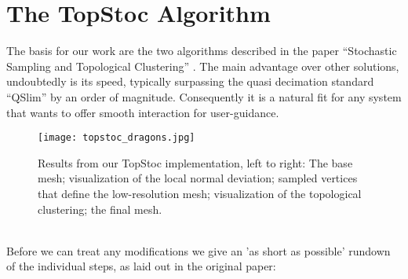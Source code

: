 \section{The TopStoc Algorithm}
\label{topstoc1}

The basis for our work are the two algorithms described in the paper ``Stochastic Sampling and Topological Clustering'' \citep[cf.][]{Boubekeur2009}.
The main advantage over other solutions, undoubtedly is its speed, typically surpassing the quasi decimation standard ``QSlim'' by an order of magnitude.
Consequently it is a natural fit for any system that wants to offer smooth interaction for user-guidance. 
\begin{figure}[ht]
\centering
\texttt{[image: topstoc\_dragons.jpg]}
\caption{Results from our TopStoc implementation, left to right: The base mesh; visualization of the local normal deviation; sampled vertices that define the low-resolution mesh; visualization of the topological clustering; the final mesh.}
\label{fig:topstoc_dragons}
\end{figure}\\
Before we can treat any modifications we give an 'as short as possible' rundown of the individual steps, as laid out in the original paper:
